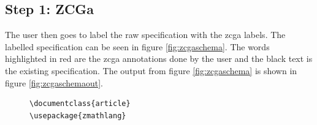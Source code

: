 \subsection{Step 1: ZCGa}

The user then goes to label the raw specification with the \gls{zcga} labels.
The labelled specification can be seen in figure \ref{fig:zcgaschema}. The words
highlighted in {\color{red}red} are the \gls{zcga} annotations done by the user
and the black text is the existing specification. The output from figure \ref{fig:zcgaschema}
is shown in figure \ref{fig:zcgaschemaout}.

\begin{figure}[H]
\centering
\begin{minipage}{0.45\textwidth}
\centering
\begin{tiny}
\begin{BVerbatim}[commandchars=+\[\]]
\documentclass{article}
\usepackage{zmathlang}


\end{BVerbatim}
\end{tiny}
\end{minipage}
\end{figure}
